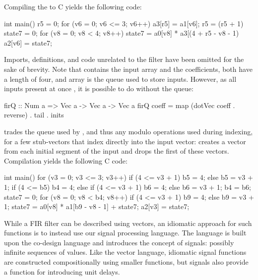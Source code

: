 \documentclass[../paper.tex]{subfiles}
\begin{document}

Compiling the  to C yields the following code:

\begin{code}
int main() {    
  r5 = 0;
  for (v6 = 0; v6 <= 3; v6++) {
    a3[r5] = a1[v6];
    r5 = (r5 + 1) %
    state7 = 0;
    for (v8 = 0; v8 < 4; v8++)
      state7 = a0[v8] * a3[(4 + r5 - v8 - 1) %
    a2[v6] = state7;
  }
}
\end{code}

\noindent Imports, definitions, and code unrelated to the filter have been omitted for the sake of brevity. Note that  contains the input array and  the coefficients, both have a length of four, and array  is the queue used to store inputs. However, as all inputs present at once , it is possible to do without the queue:


\begin{code}
firQ :: Num a => Vec a -> Vec a -> Vec a
firQ coeff = map (dotVec coeff . reverse) . tail . inits
\end{code}

 trades the queue used by , and thus any modulo operations used during indexing, for a few stub-vectors that index directly into the input vector:  creates a vector from each initial segment of the input and  drops the first of these vectors. Compilation yields the following C code:

\begin{code}
int main() {
  for (v3 = 0; v3 <= 3; v3++) {
    if (4 <= v3 + 1) { b5 = 4; } else { b5 = v3 + 1; }
    if (4 <= b5) { b4 = 4; }
    else {
      if (4 <= v3 + 1) { b6 = 4; } else { b6 = v3 + 1; }
      b4 = b6;
    }
    state7 = 0;
    for (v8 = 0; v8 < b4; v8++) {
      if (4 <= v3 + 1) { b9 = 4; } else { b9 = v3 + 1; }
      state7 = a0[v8] * a1[b9 - v8 - 1] + state7;
    }
    a2[v3] = state7;
  }
}
\end{code}

While a FIR filter can be described using vectors, an idiomatic approach for such functions is to instead use our signal processing language. The language is built upon the co-design language and introduces the concept of signals: possibly infinite sequences of values. Like the vector language, idiomatic signal functions are constructed compositionally using smaller functions, but signals also provide a function for introducing unit delays.
\end{document}
